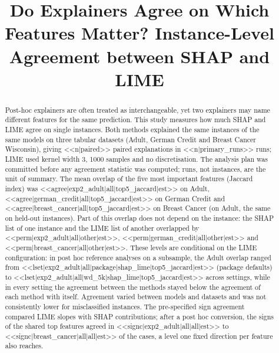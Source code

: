 
\title{Do Explainers Agree on Which Features Matter? Instance-Level Agreement between SHAP and LIME}


\begin{abstract}
Post-hoc explainers are often treated as interchangeable, yet two explainers may name
different features for the same prediction. This study measures how much SHAP and LIME
agree on single instances. Both methods explained the same instances of the same models on
three tabular datasets (Adult, German Credit and Breast Cancer Wisconsin), giving
<<n|paired>> paired explanations in <<n|primary_runs>> runs; LIME used kernel width 3,
1000 samples and no discretisation. The analysis plan was committed before any agreement
statistic was computed; runs, not instances, are the unit of summary. The mean overlap of
the five most important features (Jaccard index) was
<<agree|exp2_adult|all|top5_jaccard|est>> on Adult,
<<agree|german_credit|all|top5_jaccard|est>> on German Credit and
<<agree|breast_cancer|all|top5_jaccard|est>> on Breast Cancer (on Adult, the same on held-out
instances). Part of this overlap does not depend on the instance: the SHAP list of one
instance and the LIME list of another overlapped by <<perm|exp2_adult|all|other|est>>,
<<perm|german_credit|all|other|est>> and <<perm|breast_cancer|all|other|est>>. These levels
are conditional on the LIME configuration: in post hoc reference analyses on a subsample,
the Adult overlap ranged from <<lset|exp2_adult|all|package|shap_lime|top5_jaccard|est>>
(package defaults) to <<lset|exp2_adult|all|wd_5k|shap_lime|top5_jaccard|est>> across
settings, while in every setting the agreement between the methods stayed below the
agreement of each method with itself. Agreement varied between models and datasets and was
not consistently lower for misclassified instances. The pre-specified sign agreement
compared LIME slopes with SHAP contributions; after a post hoc conversion, the signs of the
shared top features agreed in <<signc|exp2_adult|all|all|est>> to
<<signc|breast_cancer|all|all|est>> of the cases, a level one fixed direction per feature
also reaches.
\end{abstract}

